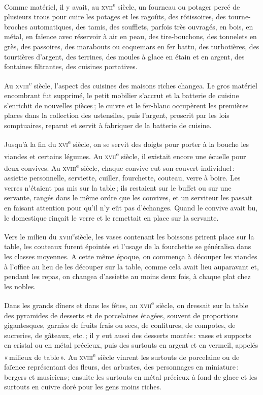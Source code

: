 Comme matériel, il y avait, au \textsc{xvii}\textsuperscript{e} siècle, un
fourneau ou potager percé de plusieurs trous pour cuire les potages et les
ragoûts, des rôtissoires, des tourne-broches automatiques, des tamis, des
soufflets, parfois très ouvragés, en bois, en métal, en faïence avec réservoir
à air en peau, des tire-bouchons, des tonnelets en grès, des passoires, des
marabouts ou coquemars en fer battu, des turbotières, des tourtières d'argent,
des terrines, des moules à glace en étain et en argent, des fontaines
filtrantes, des cuisines portatives.

Au \textsc{xviii}\textsuperscript{e} siècle, l'aspect des cuisines des maisons
riches changea. Le gros matériel encombrant fut supprimé, le petit mobilier
s'accrut et la batterie de cuisine s'enrichit de nouvelles pièces ; le cuivre
et le fer-blanc occupèrent les premières places dans la collection des
ustensiles, puis l'argent, proscrit par les lois somptuaires, reparut et servit
à fabriquer de la batterie de cuisine.

Jusqu'à la fin du \textsc{xvi}\textsuperscript{e} siècle, on se servit des
doigts pour porter à la bouche les viandes et certains légumes. Au
\textsc{xvii}\textsuperscript{e} siècle, il existait encore une écuelle pour
deux convives. Au \textsc{xviii}\textsuperscript{e} siècle, chaque convive eut
son couvert individuel : assiette personnelle, serviette, cuiller, fourchette,
couteau, verre à boire. Les verres n'étaient pas mis sur la table ; ils
restaient sur le buffet ou sur une servante, rangés dans le même ordre que les
convives, et un serviteur les passait en faisant attention pour qu'il n'y eût
pas d'échanges. Quand le convive avait bu, le domestique rinçait le verre et le
remettait en place sur la servante.

Vers le milieu du \textsc{xviii}\textsuperscript{e}siècle, les vases contenant
les boissons prirent place sur la table, les couteaux furent épointés et
l'usage de la fourchette se généralisa dans les classes moyennes. A cette même
époque, on commença à découper les viandes à l'office au lieu de les découper
sur la table, comme cela avait lieu auparavant et, pendant les repas, on
changea d’assiette au moins deux fois, à chaque plat chez les nobles.

Dans les grands dîners et dans les fêtes, au \textsc{xvii}\textsuperscript{e}
siècle, on dressait sur la table des pyramides de desserts et de porcelaines
étagées, souvent de proportions gigantesques, garnies de fruits frais ou secs,
de confitures, de compotes, de sucreries, de gâteaux, etc. ; il y eut aussi des
desserts montés : vases et supports en cristal ou en métal précieux, puis des
surtouts en argent et en vermeil, appelés « milieux de table ». Au
\textsc{xviii}\textsuperscript{e} siècle vinrent les surtouts de porcelaine ou
de faïence représentant des fleurs, des arbustes, des personnages en
miniature : bergers et musiciens ; ensuite les surtouts en métal précieux
à fond de glace et les surtouts en cuivre doré pour les gens moins riches.


